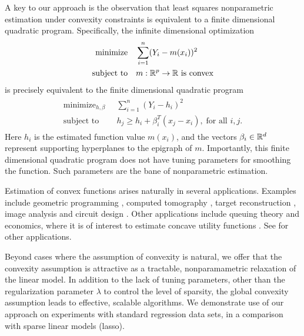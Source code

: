 A key to our approach is the observation that least squares
nonparametric estimation under convexity constraints is equivalent to
a finite dimensional quadratic program.  Specifically, the infinite
dimensional optimization 
\begin{align}
\begin{split}
\text{minimize} & \quad \sum_{i=1}^n (Y_i - m(x_i))^2 \\
\text{subject to} &  \quad m:{\mathbb R}^p\rightarrow{\mathbb R}\ \text{is
  convex}
\end{split}
\end{align}
is precisely equivalent to the finite dimensional quadratic
program 
\begin{align}
\begin{split}
\label{eq:outer}
\text{minimize}_{h, \beta} & \;\; \sum_{i=1}^n (Y_i - h_i)^2 \\
\text{subject to} & \;\; h_j \geq h_i + \beta_i^T (x_j-x_i),\; \text{for
    all $i,j$}.
\end{split}
\end{align}
Here $h_i$ is the estimated function value $m(x_i)$, and the vectors
$\beta_i \in {\mathbb R}^d$ represent supporting hyperplanes to the
epigraph of $m$.  Importantly, this finite dimensional quadratic program does
not have tuning parameters for smoothing the function. Such parameters are the bane
of nonparametric estimation.

Estimation of convex functions arises naturally in several
applications.  Examples include geometric programming \cite{Boyd04},
computed tomography \cite{Prince:90}, target reconstruction
\cite{Lele:92}, image analysis \cite{Golden:06} and circuit design
\cite{Hannah:12}.  Other applications include queuing theory
\cite{Chen:01} and economics, where it is of interest to estimate
concave utility functions \cite{Pratt:68}.  See \cite{Lim:12} for
other applications.  

Beyond cases where the assumption of convexity is
natural, we offer that the convexity assumption is attractive as a
tractable, nonparamametric relaxation of the linear model.  In
addition to the lack of tuning parameters, other than the
regularization parameter $\lambda$ to control the level of sparsity,
the global convexity assumption leads to effective, scalable algorithms.  We
demonstrate use of our approach on experiments with standard
regression data sets, in a comparison with sparse linear models
(lasso).


\def\mathbf#1{\mbox{\boldmath $#1$}} 

